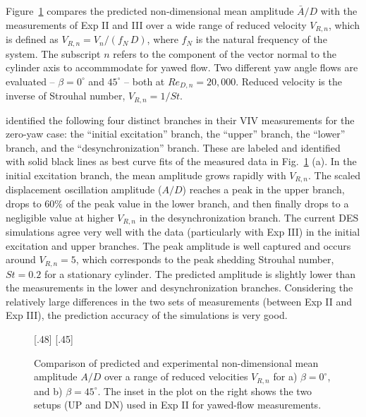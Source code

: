 Figure~\ref{fig:Amplitude_VIV} compares the predicted non-dimensional
mean amplitude $\bar{A}/D$ with the measurements of Exp II and III over a wide
range of reduced velocity $V_{R,n}$, which is defined as
$V_{R,n}=V_n/(f_N\,D)$, where $f_N$ is the natural frequency of the system. The
subscript $n$ refers to the component of the vector normal to the cylinder axis
to accommmodate for yawed flow. Two different yaw angle flows are evaluated --
$\beta=0^\circ$ and $45^\circ$ -- both at $Re_{D,n}=20,000$. Reduced velocity
is the inverse of Strouhal number, $V_{R,n} = 1/St$.

\citet{khalak1997fluid} identified the following four distinct branches in
their VIV measurements for the zero-yaw case: the ``initial excitation''
branch, the ``upper'' branch, the ``lower'' branch, and the
``desynchronization'' branch. These are labeled and identified with solid black
lines as best curve fits of the measured data in Fig.~\ref{fig:Amplitude_VIV}
(a). In the initial excitation branch, the mean amplitude grows rapidly with
$V_{R,n}$. The scaled displacement oscillation amplitude ($A/D$) reaches a peak
in the upper branch, drops to 60\% of the peak value in the lower branch, and
then finally drops to a negligible value at higher $V_{R,n}$ in the
desynchronization branch. The current DES simulations agree very well with the
data (particularly with Exp III) in the initial excitation and upper branches.
The peak amplitude is well captured and occurs around $V_{R,n}=5$, which
corresponds to the peak shedding Strouhal number, $St=0.2$ for a stationary
cylinder. The predicted amplitude is slightly lower than the measurements in
the lower and desynchronization branches. Considering the relatively large
differences in the two sets of measurements (between Exp II and Exp III), the
prediction accuracy of the simulations is very good.
%
\begin{figure}[htb!]
  \centering
    [.48\linewidth]{}
  \hspace*{\fill}
    [.45\linewidth]{}
    \caption{Comparison of predicted and experimental non-dimensional mean
      amplitude $A/D$ over a range of reduced velocities $V_{R,n}$ for a)
      $\beta=0^\circ$, and b) $\beta=45^\circ$. The inset in the plot on the right
      shows the two setups (UP and DN) used in Exp II for yawed-flow
      measurements.} 
  \label{fig:Amplitude_VIV}
\end{figure}

